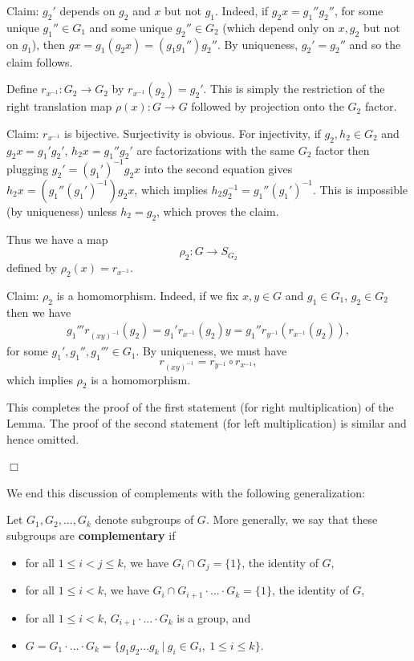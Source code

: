 Claim: $g_2'$ depends on $g_2$ and $x$ but not $g_1$. Indeed,
if $g_2x=g_1''g_2''$, for some unique $g_1''\in G_1$ and 
some unique $g_2''\in G_2$
(which depend only on $x,g_2$ but not on $g_1$),
then $gx=g_1(g_2x)=(g_1g_1'')g_2''$. By uniqueness, $g_2'=g_2''$
and so the claim follows.

Define $r_{x^{-1}}:G_2\rightarrow G_2$ by $r_{x^{-1}}(g_2)=g_2'$.
This is simply the restriction of the right translation map
$\rho(x):G\rightarrow G$ followed by projection onto the $G_2$ factor. 

Claim: $r_{x^{-1}}$ is bijective. Surjectivity is obvious.
For injectivity, if $g_2,h_2\in G_2$
and $g_2x=g_1'g_2'$, $h_2x=g_1''g_2'$ are factorizations with
the same $G_2$ factor then plugging $g_2'=(g_1')^{-1}g_2x$
into the second equation gives $h_2x=(g_1''(g_1')^{-1})g_2x$,
which implies $h_2g_2^{-1}=g_1''(g_1')^{-1}$. This is
impossible (by uniqueness) unless $h_2=g_2$, which proves the claim.

Thus we have a map
\[
\rho_2 : G\rightarrow S_{G_2}
\]
defined by $\rho_2(x)=r_{x^{-1}}$.

Claim: $\rho_2$ is a homomorphism. Indeed, if we fix $x,y\in G$ and
$g_1\in G_1$, $g_2\in G_2$ then we have
\[
\begin{array}{c}
g_1'''r_{(xy)^{-1}}(g_2)=g_1'r_{x^{-1}}(g_2)y
=g_1''r_{y^{-1}}(r_{x^{-1}}(g_2)),
\end{array}
\]
for some $g_1',g_1'',g_1'''\in G_1$. By uniqueness, we must have
\[
r_{(xy)^{-1}}=r_{y^{-1}}\circ r_{x^{-1}},
\]
which implies $\rho_2$ is a homomorphism. 

This completes the proof of the first statement 
(for right multiplication) of the Lemma.
The proof of the second statement (for left multiplication)
is similar and hence omitted.

$\Box$

We end this discussion of complements with the following
generalization:

\begin{definition} 
\label{def:k-compl}
Let $G_1,G_2,...,G_k$ denote subgroups
of $G$. More generally, we say that these subgroups are
{\bf complementary} if
\begin{itemize}
\item
for all $1\leq i<j\leq k$, we have
$G_i\cap G_j=\{1\}$, the identity of $G$,
\item
for all $1\leq i< k$, we have
$G_i\cap G_{i+1}\cdot ...\cdot G_k=\{1\}$, the identity of $G$,
\item
for all $1\leq i< k$, $G_{i+1}\cdot ...\cdot G_k$ is a group,
and
\item 
$G=G_1\cdot ...\cdot G_k=\{g_1g_2...g_k\ |\ g_i\in G_i,\ 1\leq i\leq k\}$.
\end{itemize}
\end{definition}
 
